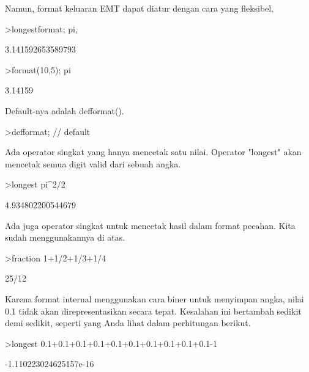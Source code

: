 \documentclass[a4paper,10pt]{article}
\begin{document}
\begin{eulernotebook}
\begin{eulercomment}
\begin{eulercomment}
\begin{eulercomment}
\begin{eulercomment}
\begin{eulercomment}
Namun, format keluaran EMT dapat diatur dengan cara yang fleksibel.
\end{eulercomment}
\begin{eulerprompt}
>longestformat; pi,
\end{eulerprompt}
\begin{euleroutput}
  3.141592653589793
\end{euleroutput}
\begin{eulerprompt}
>format(10,5); pi
\end{eulerprompt}
\begin{euleroutput}
    3.14159 
\end{euleroutput}
\begin{eulercomment}
Default-nya adalah defformat().
\end{eulercomment}
\begin{eulerprompt}
>defformat; // default
\end{eulerprompt}
\begin{eulercomment}
Ada operator singkat yang hanya mencetak satu nilai. Operator
"longest" akan mencetak semua digit valid dari sebuah angka.
\end{eulercomment}
\begin{eulerprompt}
>longest pi^2/2
\end{eulerprompt}
\begin{euleroutput}
        4.934802200544679 
\end{euleroutput}
\begin{eulercomment}
Ada juga operator singkat untuk mencetak hasil dalam format pecahan.
Kita sudah menggunakannya di atas.
\end{eulercomment}
\begin{eulerprompt}
>fraction 1+1/2+1/3+1/4
\end{eulerprompt}
\begin{euleroutput}
  25/12
\end{euleroutput}
\begin{eulercomment}
Karena format internal menggunakan cara biner untuk menyimpan angka,
nilai 0.1 tidak akan direpresentasikan secara tepat. Kesalahan ini
bertambah sedikit demi sedikit, seperti yang Anda lihat dalam
perhitungan berikut.
\end{eulercomment}
\begin{eulerprompt}
>longest 0.1+0.1+0.1+0.1+0.1+0.1+0.1+0.1+0.1+0.1-1
\end{eulerprompt}
\begin{euleroutput}
   -1.110223024625157e-16 
\end{euleroutput}

\end{eulercomment}
\end{eulercomment}
\end{eulercomment}
\end{eulercomment}
\end{eulernotebook}
\end{document}
